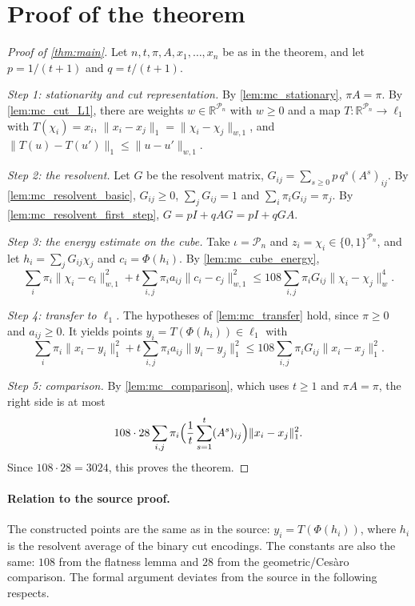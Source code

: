 \documentclass[11pt]{article}
\theoremstyle{definition}
\theoremstyle{remark}
\newcommand{\R}{\mathbb{R}}
\newcommand{\Pn}{\mathcal{P}_n}
\newcommand{\wn}[1]{\lVert #1\rVert_{w,1}}
\newcommand{\hn}[1]{\lVert #1\rVert_{w}}
\newcommand{\lnorm}[1]{\lVert #1\rVert_{1}}
\begin{document}
\section{Proof of the theorem}

\begin{proof}[Proof of \cref{thm:main}]
Let $n,t,\pi,A,x_1,\dots,x_n$ be as in the theorem, and let $p=1/(t+1)$ and $q=t/(t+1)$.

\emph{Step 1: stationarity and cut representation.} By \cref{lem:mc_stationary}, $\pi A=\pi$. By \cref{lem:mc_cut_L1}, there are weights $w\in\R^{\Pn}$ with $w\ge0$ and a map $T:\R^{\Pn}\to\ell_1$ with $T(\chi_i)=x_i$, $\lnorm{x_i-x_j}=\wn{\chi_i-\chi_j}$, and $\lnorm{T(u)-T(u')}\le\wn{u-u'}$.

\emph{Step 2: the resolvent.} Let $G$ be the resolvent matrix, $G_{ij}=\sum_{s\ge0}p\,q^s(A^s)_{ij}$. By \cref{lem:mc_resolvent_basic}, $G_{ij}\ge0$, $\sum_jG_{ij}=1$ and $\sum_i\pi_iG_{ij}=\pi_j$. By \cref{lem:mc_resolvent_first_step}, $G=pI+qAG=pI+qGA$.

\emph{Step 3: the energy estimate on the cube.} Take $\iota=\Pn$ and $z_i=\chi_i\in\{0,1\}^{\Pn}$, and let $h_i=\sum_jG_{ij}\chi_j$ and $c_i=\Phi(h_i)$. By \cref{lem:mc_cube_energy},
\[
\sum_i\pi_i\wn{\chi_i-c_i}^2+t\sum_{i,j}\pi_ia_{ij}\wn{c_i-c_j}^2\le108\sum_{i,j}\pi_iG_{ij}\hn{\chi_i-\chi_j}^4 .
\]

\emph{Step 4: transfer to $\ell_1$.} The hypotheses of \cref{lem:mc_transfer} hold, since $\pi\ge0$ and $a_{ij}\ge0$. It yields points $y_i=T(\Phi(h_i))\in\ell_1$ with
\[
\sum_i\pi_i\lnorm{x_i-y_i}^2+t\sum_{i,j}\pi_ia_{ij}\lnorm{y_i-y_j}^2\le108\sum_{i,j}\pi_iG_{ij}\lnorm{x_i-x_j}^2 .
\]

\emph{Step 5: comparison.} By \cref{lem:mc_comparison}, which uses $t\ge1$ and $\pi A=\pi$, the right side is at most
\[
108\cdot28\sum_{i,j}\pi_i\Bigl(\frac1t\sum_{s=1}^t(A^s)_{ij}\Bigr)\lnorm{x_i-x_j}^2 .
\]
Since $108\cdot28=3024$, this proves the theorem.
\end{proof}

\paragraph{Relation to the source proof.}
The constructed points are the same as in the source: $y_i=T(\Phi(h_i))$, where $h_i$ is the resolvent average of the binary cut encodings. The constants are also the same: $108$ from the flatness lemma and $28$ from the geometric/Ces\`aro comparison. The formal argument deviates from the source in the following respects.
\end{document}

